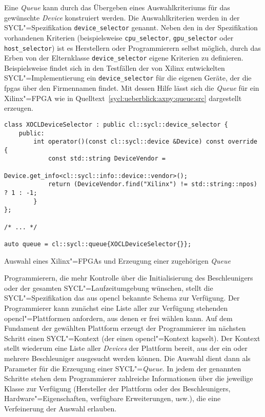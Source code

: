 Eine \textit{Queue} kann durch das Übergeben eines Auswahlkriteriums für das
gewünschte \textit{Device} konstruiert werden. Die Auswahlkriterien werden in
der SYCL"=Spezifikation \texttt{device\_selector} genannt. Neben den in der
Spezifikation vorhandenen Kriterien (beispielsweise \texttt{cpu\_selector},
\texttt{gpu\_selector} oder \texttt{host\_selector}) ist es Herstellern oder
Programmierern selbst möglich, durch das Erben von der Elternklasse
\texttt{device\_selector} eigene Kriterien zu definieren. Beispielsweise findet
sich in den Testfällen der von Xilinx entwickelten SYCL"=Implementierung ein
\texttt{device\_selector} für die eigenen Geräte, der die \gls{fpga}s über den
Firmennamen findet. Mit dessen Hilfe lässt sich die \textit{Queue} für ein
Xilinx"=FPGA wie in Quelltext~\ref{sycl:ueberblick:axpy:queue:src} dargestellt
erzeugen.
%
\begin{code}
    \begin{verbatim}
class XOCLDeviceSelector : public cl::sycl::device_selector {
    public:
        int operator()(const cl::sycl::device &Device) const override {
            const std::string DeviceVendor =
                            Device.get_info<cl::sycl::info::device::vendor>();
            return (DeviceVendor.find("Xilinx") != std::string::npos) ? 1 : -1;
        }
};

/* ... */

auto queue = cl::sycl::queue{XOCLDeviceSelector{}};
    \end{verbatim}
    \caption{Auswahl eines Xilinx"=FPGAs und Erzeugung einer zugehörigen
             \textit{Queue}}
    \label{sycl:ueberblick:axpy:queue:src}
\end{code}
%
\vspace{5mm}
Programmierern, die mehr Kontrolle über die Initialisierung des Beschleunigers
oder der gesamten SYCL"=Laufzeitumgebung wünschen, stellt die
SYCL"=Spezifikation das aus \gls{opencl} bekannte Schema zur Verfügung. Der
Programmierer kann zunächst eine Liste aller zur Verfügung stehenden
\gls{opencl}"=Plattformen anfordern, aus denen er frei wählen kann. Auf dem
Fundament der gewählten Plattform erzeugt der Programmierer im nächsten Schritt
einen SYCL"=Kontext (der einen \gls{opencl}"=Kontext kapselt). Der Kontext
stellt wiederum eine Liste aller \textit{Devices} der Plattform bereit, aus der
ein oder mehrere Beschleuniger ausgesucht werden können. Die Auswahl dient dann
als Parameter für die Erzeugung einer SYCL"=\textit{Queue}. In jedem der
genannten Schritte stehen dem Programmierer zahlreiche Informationen über die
jeweilige Klasse zur Verfügung (Hersteller der Plattform oder des
Beschleunigers, Hardware"=Eigenschaften, verfügbare Erweiterungen, usw.), die
eine Verfeinerung der Auswahl erlauben.

